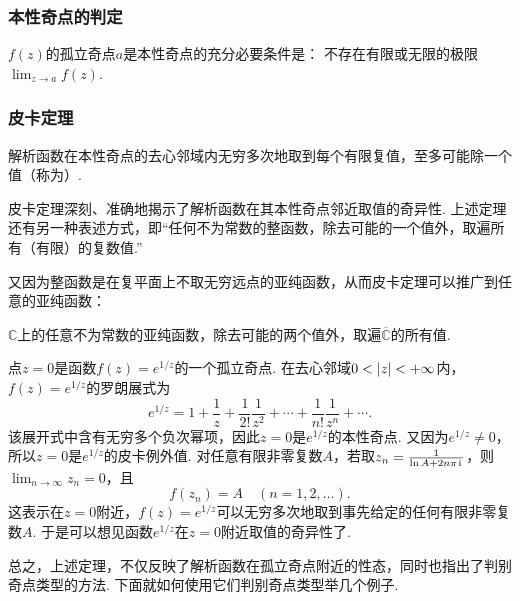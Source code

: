 \subsubsection{本性奇点的判定}
\begin{theorem}
\(f(z)\)的孤立奇点\(a\)是本性奇点的充分必要条件是：
不存在有限或无限的极限\(\lim_{z \to a} f(z)\).
\end{theorem}

\subsubsection{皮卡定理}
\begin{theorem}[皮卡定理]
解析函数在本性奇点的去心邻域内无穷多次地取到每个有限复值，至多可能除一个值（称为）.
\end{theorem}
皮卡定理深刻、准确地揭示了解析函数在其本性奇点邻近取值的奇异性.
上述定理还有另一种表述方式，即“任何不为常数的整函数，除去可能的一个值外，取遍所有（有限）的复数值.”

又因为整函数是在复平面上不取无穷远点的亚纯函数，从而皮卡定理可以推广到任意的亚纯函数：\begin{theorem}
\(\mathbb{C}\)上的任意不为常数的亚纯函数，除去可能的两个值外，取遍\(\overline{\mathbb{C}}\)的所有值.
\end{theorem}

\begin{example}
点\(z=0\)是函数\(f(z) = e^{1/z}\)的一个孤立奇点.
在去心邻域\(0<\abs{z}<+\infty\)内，\(f(z) = e^{1/z}\)的罗朗展式为\[
e^{1/z} = 1 + \frac{1}{z} + \frac{1}{2!} \frac{1}{z^2} + \dotsb + \frac{1}{n!} \frac{1}{z^n} + \dotsb.
\]该展开式中含有无穷多个负次幂项，因此\(z=0\)是\(e^{1/z}\)的本性奇点.
又因为\(e^{1/z}\neq0\)，所以\(z=0\)是\(e^{1/z}\)的皮卡例外值.
对任意有限非零复数\(A\)，若取\(z_n = \frac{1}{\ln A + 2n\pi\kern1pt\mathrm{i}\kern1pt}\)，则\(\lim_{n\to\infty} z_n = 0\)，且\[
f(z_n) = A
\quad(n=1,2,\dotsc).
\]这表示在\(z=0\)附近，\(f(z) = e^{1/z}\)可以无穷多次地取到事先给定的任何有限非零复数\(A\).
于是可以想见函数\(e^{1/z}\)在\(z=0\)附近取值的奇异性了.
\end{example}

总之，上述定理，不仅反映了解析函数在孤立奇点附近的性态，同时也指出了判别奇点类型的方法.
下面就如何使用它们判别奇点类型举几个例子.

